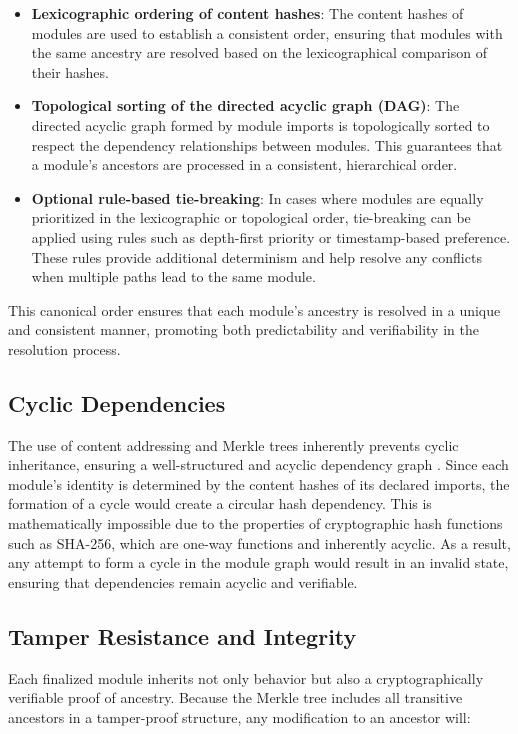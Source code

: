 \documentclass[sigplan,screen]{acmart}
\begin{document}
\begin{itemize}
    \item \textbf{Lexicographic ordering of content hashes}: The content hashes of modules are used to establish a consistent order, ensuring that modules with the same ancestry are resolved based on the lexicographical comparison of their hashes.
    \item \textbf{Topological sorting of the directed acyclic graph (DAG)}: The directed acyclic graph formed by module imports is topologically sorted to respect the dependency relationships between modules. This guarantees that a module's ancestors are processed in a consistent, hierarchical order.
    \item \textbf{Optional rule-based tie-breaking}: In cases whe\-re modules are equally prioritized in the lexicographic or topological order, tie-breaking can be applied using rules such as depth-first priority or timestamp-based preference. These rules provide additional determinism and help resolve any conflicts when multiple paths lead to the same module.
\end{itemize}

This canonical order ensures that each module's ancestry is resolved in a unique and consistent manner, promoting both predictability and verifiability in the resolution process.

\subsection{Cyclic Dependencies}
\label{sec:cyclic-deps}

The use of content addressing and Merkle trees inherently prevents cyclic inheritance, ensuring a well-struc\-tured and acyclic dependency graph \cite{benet2014}. Since each module's identity is determined by the content hashes of its declared imports, the formation of a cycle would create a circular hash dependency. This is mathematically impossible due to the properties of cryptographic hash functions such as SHA-256, which are one-way functions and inherently acyclic. As a result, any attempt to form a cycle in the module graph would result in an invalid state, ensuring that dependencies remain acyclic and verifiable.

\subsection{Tamper Resistance and Integrity}

Each finalized module inherits not only behavior but also a cryptographically verifiable proof of ancestry. Because the Merkle tree includes all transitive ancestors in a tamper-proof structure, any modification to an ancestor will:
\end{document}
